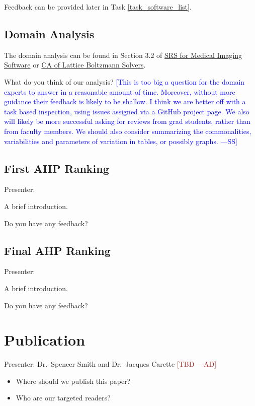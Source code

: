 \documentclass[12pt]{article}
\newcommand{\authornote}[3]{\textcolor{#1}{[#3 ---#2]}}
\newcommand{\authornote}[3]{}
\newcommand{\wss}[1]{\authornote{blue}{SS}{#1}} %
\newcommand{\ad}[1]{\authornote{brown}{AD}{#1}} %
\begin{document}
Feedback can be provided later in Task \ref{task_software_list}.

\subsection{Domain Analysis}
\label{domain_analysis}
The domain analysis can be found in Section 3.2 of
\href{https://github.com/Ao99/MISEG/blob/master/docs/SRS/SRS.pdf}{SRS for
Medical Imaging Software} or
\href{https://github.com/peter-michalski/LatticeBoltzmannSolvers/blob/master/docs/SRS/CA.pdf}{CA
of Lattice Boltzmann Solvers}.

What do you think of our analysis?  \wss{This is too big a question for the
  domain experts to answer in a reasonable amount of time.  Moreover, without
  more guidance their feedback is likely to be shallow.  I think we are better
  off with a task based inspection, using issues assigned via a GitHub project
  page.  We also will likely be more successful asking for reviews from grad
  students, rather than from faculty members.  We should also consider
  summarizing the commonalities, variabilities and parameters of variation in
  tables, or possibly graphs.}

\subsection{First AHP Ranking}
\label{first_AHP}
Presenter:

A brief introduction. 

Do you have any feedback?

\subsection{Final AHP Ranking}
\label{final_AHP}
Presenter:

A brief introduction. 

Do you have any feedback?

\section{Publication}
Presenter: Dr.\ Spencer Smith and Dr.\ Jacques Carette \ad{TBD}

\begin{itemize}
\item Where should we publish this paper?
\item Who are our targeted readers?
\end{itemize}
\end{document}

